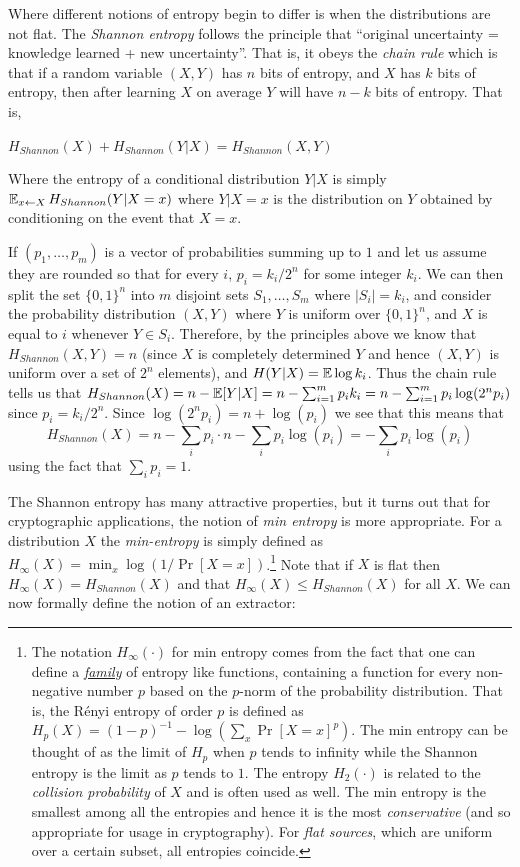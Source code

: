 Where different notions of entropy begin to differ is when the
distributions are not flat. The \emph{Shannon entropy} follows the
principle that ``original uncertainty = knowledge learned + new
uncertainty''. That is, it obeys the \emph{chain rule} which is that if
a random variable \((X,Y)\) has \(n\) bits of entropy, and \(X\) has
\(k\) bits of entropy, then after learning \(X\) on average \(Y\) will
have \(n-k\) bits of entropy. That is,

\(H_{Shannon}(X)+H_{Shannon}(Y|X) = H_{Shannon}(X,Y)\)

Where the entropy of a conditional distribution \(Y|X\) is simply
\(\operatorname*{\mathbb E}_{x\leftarrow X} H_{Shannon}(Y|X=x)\) where \(Y|X=x\) is the
distribution on \(Y\) obtained by conditioning on the event that
\(X=x\).

If \((p_1,\ldots,p_m)\) is a vector of probabilities summing up to \(1\)
and let us assume they are rounded so that for every \(i\),
\(p_i = k_i/2^n\) for some integer \(k_i\). We can then split the set
\(\{0,1\}^n\) into \(m\) disjoint sets \(S_1,\ldots,S_m\) where
\(|S_i|=k_i\), and consider the probability distribution \((X,Y)\) where
\(Y\) is uniform over \(\{0,1\}^n\), and \(X\) is equal to \(i\)
whenever \(Y\in S_i\). Therefore, by the principles above we know that
\(H_{Shannon}(X,Y)=n\) (since \(X\) is completely determined \(Y\) and
hence \((X,Y)\) is uniform over a set of \(2^n\) elements), and
\(H(Y|X)= \operatorname*{\mathbb E} \log k_i\). Thus the chain rule tells us that
\(H_{Shannon}(X) = n - \operatorname*{\mathbb E}[Y|X] = n - \sum_{i=1}^m p_i k_i = n - \sum_{i=1}^m p_i \log(2^n p_i)\)
since \(p_i = k_i/2^n\). Since \(\log(2^n p_i) = n + \log(p_i)\) we see
that this means that \[
H_{Shannon}(X) =  n - \sum_i p_i \cdot n  - \sum_i p_i \log(p_i) = - \sum_i p_i \log (p_i)
\] using the fact that \(\sum_i p_i = 1\).

The Shannon entropy has many attractive properties, but it turns out
that for cryptographic applications, the notion of \emph{min entropy} is
more appropriate. For a distribution \(X\) the \emph{min-entropy} is
simply defined as \(H_{\infty}(X)= \min_x \log(1/\Pr[X=x])\).\footnote{The
  notation \(H_{\infty}(\cdot)\) for min entropy comes from the fact
  that one can define a \href{https://goo.gl/HvVgu1}{\emph{family}} of
  entropy like functions, containing a function for every non-negative
  number \(p\) based on the \(p\)-norm of the probability distribution.
  That is, the Rényi entropy of order \(p\) is defined as
  \(H_p(X)=(1-p)^{-1}-\log(\sum_x \Pr[X=x]^p)\). The min entropy can be
  thought of as the limit of \(H_p\) when \(p\) tends to infinity while
  the Shannon entropy is the limit as \(p\) tends to \(1\). The entropy
  \(H_2(\cdot)\) is related to the \emph{collision probability} of \(X\)
  and is often used as well. The min entropy is the smallest among all
  the entropies and hence it is the most \emph{conservative} (and so
  appropriate for usage in cryptography). For \emph{flat sources}, which
  are uniform over a certain subset, all entropies coincide.} Note that
if \(X\) is flat then \(H_{\infty}(X)=H_{Shannon}(X)\) and that
\(H_{\infty}(X) \leq H_{Shannon}(X)\) for all \(X\). We can now formally
define the notion of an extractor:


